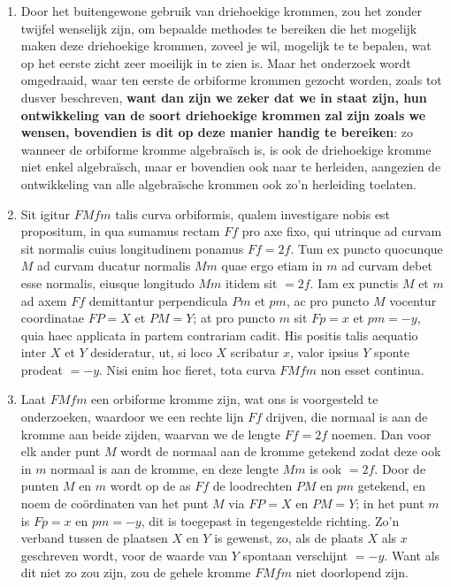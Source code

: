 \documentclass[10pt,a4paper]{article}
\newcommand{\switchenum}{\setcounter{enumi}{\arabic{enumi}-1}\switchcolumn}
\begin{document}
\begin{paracol}{2}
\begin{enumerate}[topsep=1px]
		\switchenum
		\item Door het buitengewone gebruik van driehoekige krommen, zou het zonder twijfel wenselijk zijn, om bepaalde methodes te bereiken die het mogelijk maken deze driehoekige krommen, zoveel je wil, mogelijk te te bepalen, wat op het eerste zicht zeer moeilijk in te zien is. Maar het onderzoek wordt omgedraaid, waar ten eerste de orbiforme krommen gezocht worden,  zoals tot dusver beschreven, \textbf{want dan zijn we zeker dat we in staat zijn, hun ontwikkeling van de soort driehoekige krommen zal zijn zoals we wensen, bovendien is dit op deze manier handig te bereiken}: zo wanneer de orbiforme kromme algebraïsch is, is ook de driehoekige kromme niet enkel algebraïsch, maar er bovendien ook naar te herleiden, aangezien de ontwikkeling van alle algebraïsche krommen ook zo'n herleiding toelaten.
		
		\switchcolumn*
		
		\item Sit igitur $FMfm$ talis curva orbiformis, qualem investigare nobis est propositum, in qua sumamus rectam $Ff$ pro axe fixo, qui utrinque ad curvam sit normalis cuius longitudinem ponamus $Ff=2f$. Tum ex puncto quocunque $M$ ad curvam ducatur normalis $Mm$ quae ergo etiam in $m$ ad curvam debet esse normalis, eiusque longitudo $Mm$ itidem sit $=2f$. Iam ex punctis $M$ et $m$ ad axem $Ff$ demittantur perpendicula $Pm$ et $pm$, ac pro puncto $M$ vocentur coordinatae $FP=X$ et $PM=Y$; at pro puncto $m$ sit $Fp=x$ et $pm = -y$, quia haec applicata in partem contrariam cadit. His positis talis aequatio inter $X$ et $Y$ desideratur, ut, si loco $X$ scribatur $x$, valor ipsius $Y$ sponte prodeat $=-y$. Nisi enim hoc fieret, tota curva $FMfm$ non esset continua.
		
		\switchenum
		\item Laat $FMfm$ een orbiforme kromme zijn, wat ons is voorgesteld te onderzoeken, waardoor we een rechte lijn $Ff$ drijven, die normaal is aan de kromme aan beide zijden, waarvan we de lengte $Ff=2f$ noemen. Dan voor elk ander punt $M$ wordt de normaal aan de kromme getekend zodat deze ook in $m$ normaal is aan de kromme, en deze lengte $Mm$ is ook $=2f$. Door de punten $M$ en $m$ wordt op de as $Ff$ de loodrechten $PM$ en $pm$ getekend, en noem de coördinaten van het punt $M$ via $FP=X$ en $PM=Y$; in het punt $m$ is $Fp=x$ en $pm=-y$, dit is toegepast in tegengestelde richting. Zo'n verband tussen de plaatsen $X$ en $Y$ is gewenst, zo, als de plaats $X$ als $x$ geschreven wordt, voor de waarde van $Y$ spontaan verschijnt $=-y$. Want als dit niet zo zou zijn, zou de gehele kromme $FMfm$ niet doorlopend zijn.
		

\end{enumerate}
\end{paracol}
\end{document}
